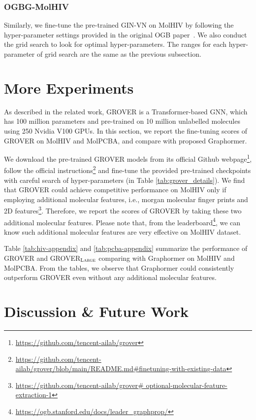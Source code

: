 \documentclass{article}
\begin{document}
\subsubsection{OGBG-MolHIV}
Similarly, we fine-tune the pre-trained GIN-{\scriptsize VN} on MolHIV by following the hyper-parameter settings provided in the original OGB paper~\cite{hu2020open}. We also conduct the grid search to look for optimal hyper-parameters. The ranges for each hyper-parameter of grid search are the same as the previous subsection.



\section{More Experiments}


As described in the related work, GROVER is a Transformer-based GNN, which has 100 million parameters and pre-trained on 10 million unlabelled molecules using 250 Nvidia V100 GPUs. In this section, we report the fine-tuning scores of GROVER on MolHIV and MolPCBA, and compare with proposed Graphormer.

We download the pre-trained GROVER models from its official Github webpage\footnote{\url{https://github.com/tencent-ailab/grover}}, follow the official instructions\footnote{\url{https://github.com/tencent-ailab/grover/blob/main/README.md\#finetuning-with-existing-data}} and fine-tune the provided pre-trained checkpoints with careful search of hyper-parameters (in Table \ref{tab:grover_details}).  We find that GROVER could achieve competitive performance on MolHIV only if employing additional molecular features, i.e., morgan molecular finger prints and 2D features\footnote{\url{https://github.com/tencent-ailab/grover\# optional-molecular-feature-extraction-1}}. Therefore, we report the scores of GROVER by taking these two additional molecular features. Please note that, from the leaderboard\footnote{\url{https://ogb.stanford.edu/docs/leader_graphprop/}}, we can know such additional molecular features are very effective on MolHIV dataset.


Table \ref{tab:hiv-appendix} and \ref{tab:pcba-appendix} summarize the performance of GROVER and GROVER$_{\small \textsc{Large}}$ comparing with Graphormer on MolHIV and MolPCBA. From the tables, we observe that Graphormer could consistently outperform GROVER even without any additional molecular features.



\section{Discussion \& Future Work}\label{sec:discuss}
\end{document}
